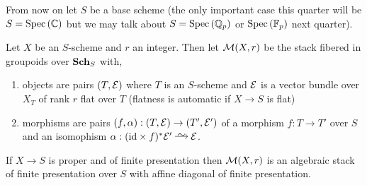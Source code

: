 \documentclass[12pt]{article}
\begin{document}
\newcommand{\Isom}{\mathrm{Isom}}

From now on let $S$ be a base scheme (the only important case this quarter will be $S = \mathrm{Spec}\left( \mathbb{C} \right)$ but we may talk about $S = \mathrm{Spec}\left( \mathbb{Q}_p \right)$ or $\mathrm{Spec}\left( \mathbb{F}_p \right)$ next quarter).

\begin{defn}
Let $X$ be an $S$-scheme and $r$ an integer. Then let $\mathcal{M}(X, r)$ be the stack fibered in groupoids over $\mathbf{Sch}_S$ with,
\begin{enumerate}
\item objects are pairs $(T, \mathcal{E})$ where $T$ is an $S$-scheme and $\mathcal{E}$ is a vector bundle over $X_T$ of rank $r$ flat over $T$ (flatness is automatic if $X \to S$ is flat)
\item morphisms are pairs $(f, \alpha) : (T, \mathcal{E}) \to (T', \mathcal{E}')$ of a morphism $f : T \to T'$ over $S$ and an isomophism $\alpha : (\id \times f)^* \E' \iso \E$.
\end{enumerate} 
\end{defn}

\begin{theorem}
If $X \to S$ is proper and of finite presentation then $\mathcal{M}(X, r)$ is an algebraic stack of finite presentation over $S$ with affine diagonal of finite presentation.
\end{theorem}

\renewcommand{\Coh}{\mathbf{Coh}}
\end{document}
